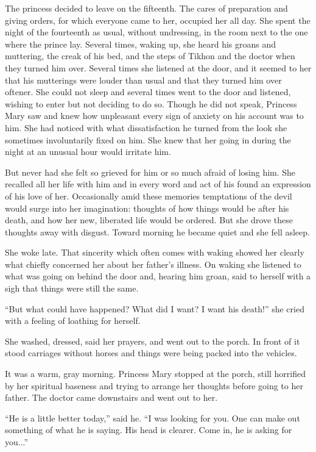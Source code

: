 The princess decided to leave on the fifteenth. The cares of
preparation and giving orders, for which everyone came to her,
occupied her all day.  She spent the night of the fourteenth as
usual, without undressing, in the room next to the one where the
prince lay. Several times, waking up, she heard his groans and
muttering, the creak of his bed, and the steps of Tikhon and the
doctor when they turned him over. Several times she listened at
the door, and it seemed to her that his mutterings were louder
than usual and that they turned him over oftener. She could not
sleep and several times went to the door and listened, wishing to
enter but not deciding to do so. Though he did not speak,
Princess Mary saw and knew how unpleasant every sign of anxiety
on his account was to him.  She had noticed with what
dissatisfaction he turned from the look she sometimes
involuntarily fixed on him. She knew that her going in during the
night at an unusual hour would irritate him.

But never had she felt so grieved for him or so much afraid of
losing him. She recalled all her life with him and in every word
and act of his found an expression of his love of
her. Occasionally amid these memories temptations of the devil
would surge into her imagination: thoughts of how things would be
after his death, and how her new, liberated life would be
ordered. But she drove these thoughts away with disgust. Toward
morning he became quiet and she fell asleep.

She woke late. That sincerity which often comes with waking
showed her clearly what chiefly concerned her about her father's
illness. On waking she listened to what was going on behind the
door and, hearing him groan, said to herself with a sigh that
things were still the same.

``But what could have happened? What did I want? I want his
death!'' she cried with a feeling of loathing for herself.

She washed, dressed, said her prayers, and went out to the
porch. In front of it stood carriages without horses and things
were being packed into the vehicles.

It was a warm, gray morning. Princess Mary stopped at the porch,
still horrified by her spiritual baseness and trying to arrange
her thoughts before going to her father. The doctor came
downstairs and went out to her.

``He is a little better today,'' said he. ``I was looking for
you. One can make out something of what he is saying. His head is
clearer. Come in, he is asking for you...''

